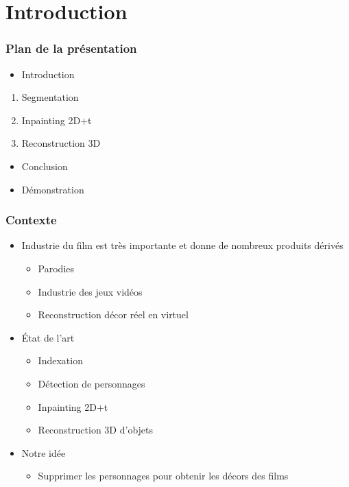 \section{Introduction}
\begin{frame}
  \frametitle{Plan de la présentation}
  \begin{itemize}
  \item Introduction
  \end{itemize}
  \begin{enumerate}
  \item Segmentation
  \item Inpainting 2D+t
  \item Reconstruction 3D
  \end{enumerate}
  \begin{itemize}
  \item Conclusion
  \item Démonstration
  \end{itemize}
  

\end{frame}



 \begin{frame}
   \frametitle{Contexte}
   
   \begin{itemize}
   
   \item Industrie du film est très importante et donne de nombreux produits dérivés
   	\begin{itemize}
   	\item Parodies
   	\item Industrie des jeux vidéos
   	\item Reconstruction décor réel en virtuel
   	\end{itemize}
   
   \item État de l'art
   	\begin{itemize}
   	\item Indexation
   	\item Détection de personnages
   	\item Inpainting 2D+t
   	\item Reconstruction 3D d'objets

   	\end{itemize}
   	
   \item Notre idée
   	\begin{itemize}
   	\item Supprimer les personnages pour obtenir les décors des films
   	\end{itemize}
   
   \end{itemize}
 
 \end{frame}


